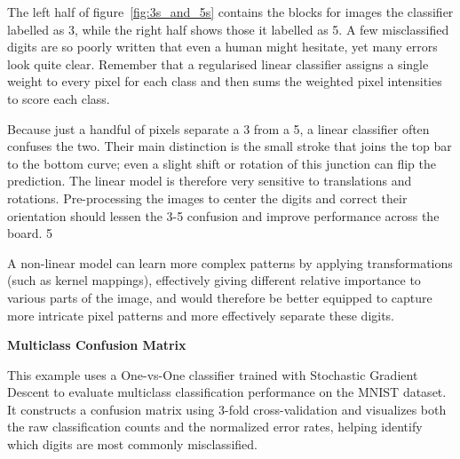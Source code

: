 \documentclass[12pt,letter]{article}
\begin{document}
The left half of figure~\ref{fig:3s_and_5s} contains the blocks for images the classifier labelled as 3, while the right half shows those it labelled as 5. A few misclassified digits are so poorly written that even a human might hesitate, yet many errors look quite clear. Remember that a regularised linear classifier assigns a single weight to every pixel for each class and then sums the weighted pixel intensities to score each class. 

Because just a handful of pixels separate a 3 from a 5, a linear classifier often confuses the two. Their main distinction is the small stroke that joins the top bar to the bottom curve; even a slight shift or rotation of this junction can flip the prediction. The linear model is therefore very sensitive to translations and rotations. Pre-processing the images to center the digits and correct their orientation should lessen the 3-5 confusion and improve performance across the board.
5 

A non-linear model can learn more complex patterns by applying transformations (such as kernel mappings), effectively giving different relative importance to various parts of the image, and would therefore be better equipped to  capture more intricate pixel patterns and more effectively separate these digits.






\begin{example}
\textbf{Multiclass Confusion Matrix}

\noindent This example uses a One-vs-One classifier trained with Stochastic Gradient Descent to evaluate multiclass classification performance on the MNIST dataset. It constructs a confusion matrix using 3-fold cross-validation and visualizes both the raw classification counts and the normalized error rates, helping identify which digits are most commonly misclassified.
\end{example}

\pagebreak

\end{document}
